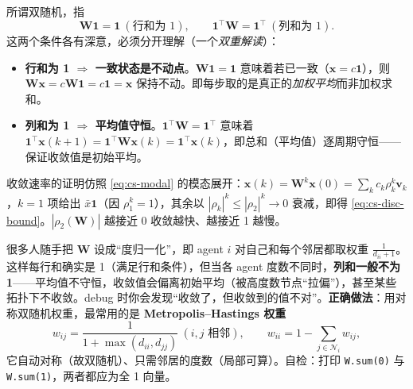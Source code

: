 
\noindent 所谓双随机，指
\begin{equation}
  \mathbf{W}\mathbf{1}=\mathbf{1}\ (\text{行和为 1}),\qquad \mathbf{1}^\top\mathbf{W}=\mathbf{1}^\top\ (\text{列和为 1}).
  \label{eq:cs-doubly}
\end{equation}
这两个条件各有深意，必须分开理解（一个\emph{双重解读}）：
\begin{itemize}
  \item \textbf{行和为 1 $\Rightarrow$ 一致状态是不动点}。$\mathbf{W}\mathbf{1}=\mathbf{1}$ 意味着若已一致（$\mathbf{x}=c\mathbf{1}$），则 $\mathbf{W}\mathbf{x}=c\mathbf{W}\mathbf{1}=c\mathbf{1}=\mathbf{x}$ 保持不动。即每步取的是真正的\emph{加权平均}而非加权求和。
  \item \textbf{列和为 1 $\Rightarrow$ 平均值守恒}。$\mathbf{1}^\top\mathbf{W}=\mathbf{1}^\top$ 意味着 $\mathbf{1}^\top\mathbf{x}(k{+}1)=\mathbf{1}^\top\mathbf{W}\mathbf{x}(k)=\mathbf{1}^\top\mathbf{x}(k)$，即总和（平均值）逐周期守恒——保证收敛值是初始平均。
\end{itemize}
收敛速率的证明仿照 \cref{eq:cs-modal} 的模态展开：$\mathbf{x}(k)=\mathbf{W}^k\mathbf{x}(0)=\sum_k c_k\rho_k^k\mathbf{v}_k$，$k=1$ 项给出 $\bar x\mathbf{1}$（因 $\rho_1^k=1$），其余以 $|\rho_k|^k\le|\rho_2|^k\to0$ 衰减，即得 \cref{eq:cs-disc-bound}。$|\rho_2(\mathbf{W})|$ 越接近 0 收敛越快、越接近 1 越慢。

\begin{pitfall}
很多人随手把 $\mathbf{W}$ 设成“度归一化”，即 agent $i$ 对自己和每个邻居都取权重 $\tfrac{1}{d_{ii}+1}$。这样每行和确实是 1（满足行和条件），但当各 agent 度数不同时，\textbf{列和一般不为 1}——平均值不守恒，收敛值会偏离初始平均（被高度数节点“拉偏”），甚至某些拓扑下不收敛。debug 时你会发现“收敛了，但收敛到的值不对”。\textbf{正确做法}：用对称双随机权重，最常用的是 \textbf{Metropolis--Hastings 权重}
\[
  w_{ij}=\frac{1}{1+\max(d_{ii},d_{jj})}\ (i,j\text{ 相邻}),\qquad w_{ii}=1-\sum_{j\in\mathcal{N}_i}w_{ij},
\]
它自动对称（故双随机）、只需邻居的度数（局部可算）。自检：打印 \verb|W.sum(0)| 与 \verb|W.sum(1)|，两者都应为全 1 向量。
\end{pitfall}

